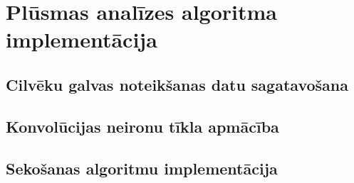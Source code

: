 \chapter{Plūsmas analīzes algoritma implementācija}
\section{Cilvēku galvas noteikšanas datu sagatavošana}
\section{Konvolūcijas neironu tīkla apmācība}
\section{Sekošanas algoritmu implementācija}